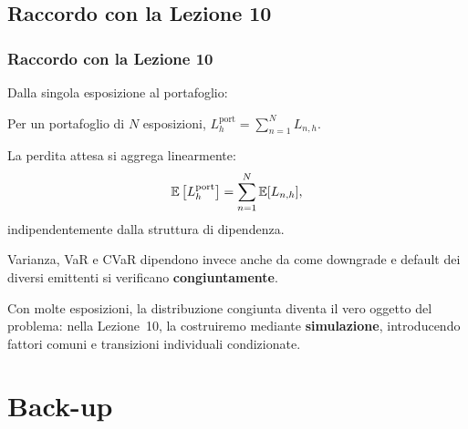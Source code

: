

\subsection{Raccordo con la Lezione 10}%

\begin{frame}%
%

\frametitle{Raccordo con la Lezione 10}%
%

%


Dalla singola esposizione al portafoglio:

\begin{stepitemize}
\item Per un portafoglio di $N$ esposizioni, $L_{h}^{\mathrm{port}} =
\sum_{n=1}^{N}L_{n,h}$.

\item La perdita attesa si aggrega linearmente:
\[
\mathbb{E}\left[  L_{h}^{\mathrm{port}}\right]  = \sum_{n=1}^{N}\mathbb{E}[L_{n,h}],
\]
indipendentemente dalla struttura di dipendenza.

\item Varianza, VaR e CVaR dipendono invece anche da come downgrade e default
dei diversi emittenti si verificano \textbf{congiuntamente}.

\item Con molte esposizioni, la distribuzione congiunta diventa il vero
oggetto del problema: nella Lezione~10, la costruiremo mediante
\textbf{simulazione}, introducendo fattori comuni e transizioni individuali condizionate.
\end{stepitemize}

%

\transboxout
\end{frame}%




\section{Back-up}

